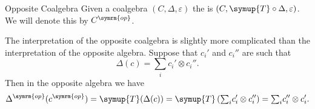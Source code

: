 \documentclass[fleqn]{NotesClass}
\newcommand{\switch}{\symup{T}}
\newcommand{\op}{\symrm{op}}
\newcommand{\tsum}{{\textstyle \sum}}
\begin{document}
    \begin{dfn}{Opposite Coalgebra}{}
        Given a coalgebra \((C, \Delta, \varepsilon)\) the  is \((C, \switch \circ \Delta, \varepsilon)\).
        We will denote this by \(C^{\op}\).
    \end{dfn}
    
    The interpretation of the opposite coalgebra is slightly more complicated than the interpretation of the opposite algebra.
    Suppose that \(c_i'\) and \(c_i''\) are such that
    \begin{equation}
        \Delta(c) = \sum_i c_i' \otimes c_i''.
    \end{equation}
    Then in the opposite algebra we have
    \begin{equation}
        \Delta^{\op}(c^{\op}) = \switch(\Delta(c)) = \switch\left( \tsum_i c_i' \otimes c_i'' \right) = \tsum_i c_i'' \otimes c_i'.
    \end{equation}
    
\end{document}
